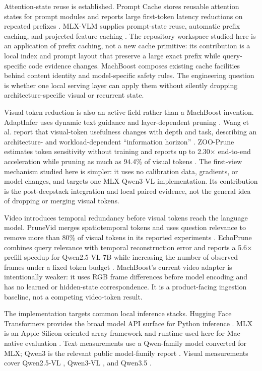 \documentclass[11pt]{article}
\begin{document}
Attention-state reuse is established. Prompt Cache stores reusable attention states for prompt modules and reports large first-token latency reductions on repeated prefixes \cite{gim2023promptcache}. MLX-VLM supplies prompt-state reuse, automatic prefix caching, and projected-feature caching \cite{mlxvlm2026}. The repository workspace studied here is an application of prefix caching, not a new cache primitive: its contribution is a local index and prompt layout that preserve a large exact prefix while query-specific code evidence changes. MachBoost composes existing cache facilities behind content identity and model-specific safety rules. The engineering question is whether one local serving layer can apply them without silently dropping architecture-specific visual or recurrent state.

Visual token reduction is also an active field rather than a MachBoost invention. AdaptInfer uses dynamic text guidance and layer-dependent pruning \cite{zhang2025adaptinfer}. Wang et al. report that visual-token usefulness changes with depth and task, describing an architecture- and workload-dependent ``information horizon'' \cite{wang2026informationhorizon}. ZOO-Prune estimates token sensitivity without training and reports up to 2.30$\times$ end-to-end acceleration while pruning as much as 94.4\% of visual tokens \cite{kim2026zooprune}. The first-view mechanism studied here is simpler: it uses no calibration data, gradients, or model changes, and targets one MLX Qwen3-VL implementation. Its contribution is the post-deepstack integration and local paired evidence, not the general idea of dropping or merging visual tokens.

Video introduces temporal redundancy before visual tokens reach the language model. PruneVid merges spatiotemporal tokens and uses question relevance to remove more than 80\% of visual tokens in its reported experiments \cite{huang2024prunevid}. EchoPrune combines query relevance with temporal reconstruction error and reports a 5.6$\times$ prefill speedup for Qwen2.5-VL-7B while increasing the number of observed frames under a fixed token budget \cite{li2026echoprune}. MachBoost's current video adapter is intentionally weaker: it uses RGB frame differences before model encoding and has no learned or hidden-state correspondence. It is a product-facing ingestion baseline, not a competing video-token result.

The implementation targets common local inference stacks. Hugging Face Transformers provides the broad model API surface for Python inference \cite{wolf2020transformers}. MLX is an Apple Silicon-oriented array framework and runtime used here for Mac-native evaluation \cite{mlx2023}. Text measurements use a Qwen-family model converted for MLX; Qwen3 is the relevant public model-family report \cite{qwen2025qwen3}. Visual measurements cover Qwen2.5-VL \cite{bai2025qwen25vl}, Qwen3-VL \cite{qwen2026qwen3vl}, and Qwen3.5 \cite{qwen2026qwen35}.
\end{document}
